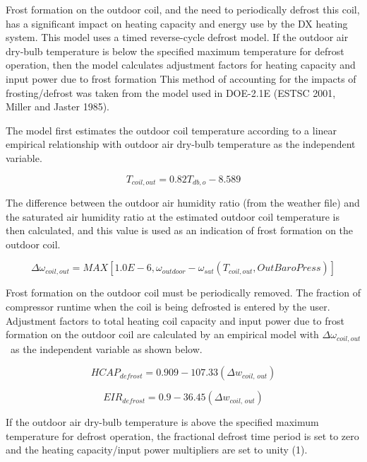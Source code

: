 Frost formation on the outdoor coil, and the need to periodically defrost this coil, has a significant impact on heating capacity and energy use by the DX heating system. This model uses a timed reverse-cycle defrost model. If the outdoor air dry-bulb temperature is below the specified maximum temperature for defrost operation, then the model calculates adjustment factors for heating capacity and input power due to frost formation This method of accounting for the impacts of frosting/defrost was taken from the model used in DOE-2.1E (ESTSC 2001, Miller and Jaster 1985).

The model first estimates the outdoor coil temperature according to a linear empirical relationship with outdoor air dry-bulb temperature as the independent variable.

\begin{equation}
  T_{coil,out} = 0.82 T_{db,o} - 8.589
\end{equation}

The difference between the outdoor air humidity ratio (from the weather file) and the saturated air humidity ratio at the estimated outdoor coil temperature is then calculated, and this value is used as an indication of frost formation on the outdoor coil.

\begin{equation}
  \Delta \omega_{coil,out} = MAX \left[ 1.0E - 6, \omega_{outdoor} - \omega_{sat} \left( T_{coil,out},OutBaroPress \right) \right]
\end{equation}

Frost formation on the outdoor coil must be periodically removed. The fraction of compressor runtime when the coil is being defrosted is entered by the user. Adjustment factors to total heating coil capacity and input power due to frost formation on the outdoor coil are calculated by an empirical model with \(\Delta \omega_{coil,out}\) as the independent variable as shown below.

\begin{equation}
  HCAP_{defrost} = 0.909 - 107.33 \left( \Delta w_{coil,\,out} \right)
\end{equation}

\begin{equation}
  EIR_{defrost} = 0.9 - 36.45 \left( \Delta w_{coil,\,out} \right)
\end{equation}

If the outdoor air dry-bulb temperature is above the specified maximum temperature for defrost operation, the fractional defrost time period is set to zero and the heating capacity/input power multipliers are set to unity (1).

